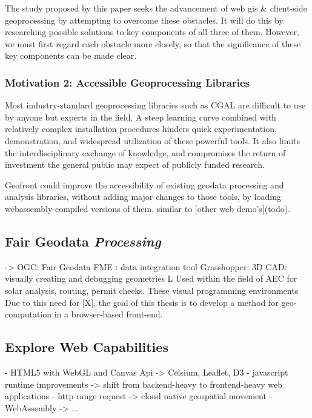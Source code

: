 The study proposed by this paper seeks the advancement of web \ac{gis} \& client-side geoprocessing by attempting to overcome these obstacles. It will do this by researching possible solutions to key components of all three of them. However, we must first regard each obstacle more closely, so that the significance of these key components can be made clear. 

\subsubsection{Motivation 2: Accessible Geoprocessing Libraries}

Most industry-standard geoprocessing libraries such as CGAL are difficult to use by anyone but experts in the field. A steep learning curve combined with relatively complex installation procedures hinders quick experimentation, demonstration, and widespread utilization of these powerful tools. It also limits the interdisciplinary exchange of knowledge, and compromises the return of investment the general public may expect of publicly funded research.

Geofront could improve the accessibility of existing geodata processing and analysis libraries, without adding major changes to those tools, by loading webassembly-compiled versions of them, similar to [other web demo's](todo).








\subsection*{Fair Geodata \emph{Processing}}
-> OGC: Fair Geodata
\m{->} FME : data integration tool
\m{->} Grasshopper: 3D CAD: visually creating and debugging geometries
       L \m{->} Used within the field of AEC for solar analysis, routing, permit checks.
These visual programming environments 
Due to this need for [X], the goal of this thesis is to develop a method for geo-computation in a browser-based front-end. 


\subsection*{Explore Web Capabilities }

- HTML5 with WebGL and Canvas Api -> Celsium, Leaflet, D3
- javascript runtime improvements -> shift from backend-heavy to frontend-heavy web applications
- http range request -> cloud native geospatial movement 
- WebAssembly -> ...

